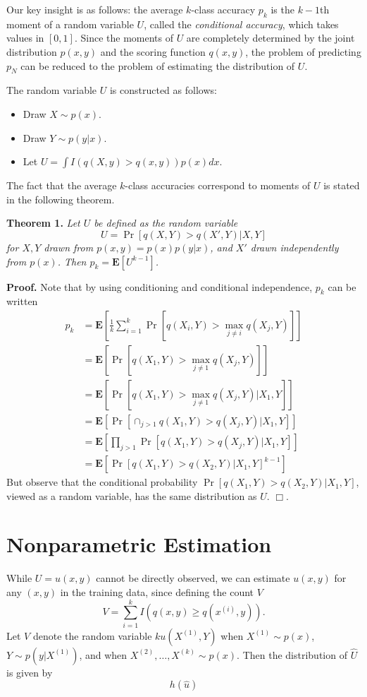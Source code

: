 \documentclass{article}
\newcommand{\E}{\textbf{E}}
\begin{document}
Our key insight is as follows: the average $k$-class accuracy $p_k$ is
the $k-1$th moment of a random variable $U$, called the
\emph{conditional accuracy}, which takes values in $[0,1]$.  Since the
moments of $U$ are completely determined by the joint distribution
$p(x, y)$ and the scoring function $q(x, y)$, the problem of
predicting $p_N$ can be reduced to the problem of estimating the
distribution of $U$.

The random variable $U$ is constructed as follows:
\begin{itemize}
\item Draw $X \sim p(x)$.
\item Draw $Y \sim p(y|x)$.
\item Let $U = \int I(q(X, y) > q(x, y)) p(x) dx.$
\end{itemize}

The fact that the average $k$-class accuracies correspond to moments of
$U$ is stated in the following theorem.

\noindent\textbf{Theorem 1.} \emph{
Let $U$ be defined as the random variable
\[U = \Pr[q(X, Y) > q(X', Y)|X, Y]\]
for $X, Y$ drawn from $p(x, y) = p(x) p(y|x)$,
and $X'$ drawn independently from $p(x)$.
Then $p_k = \E[U^{k-1}]$.
}

\noindent\textbf{Proof.}  Note that by using conditioning and
conditional independence, $p_k$ can be written
\begin{align*}
p_k &= \E\left[ \frac{1}{k}\sum_{i=1}^k  \Pr[q(X_i, Y) > \max_{j\neq i} q(X_j, Y)] \right]
\\&= \E\left[ \Pr[q(X_1, Y) > \max_{j\neq 1} q(X_j, Y)] \right]
\\&= \E[\Pr[q(X_1, Y) > \max_{j\neq 1} q(X_j, Y)|X_1, Y]]
\\&= \E[\Pr[\cap_{j > 1} q(X_1, Y) > q(X_j, Y)|X_1, Y]]
\\&= \E[\prod_{j > 1}\Pr[q(X_1, Y) > q(X_j, Y)|X_1, Y]]
\\&= \E[\Pr[q(X_1, Y) > q(X_2, Y)|X_1, Y]^{k-1}]
\end{align*}
But observe that the conditional probability $\Pr[q(X_1, Y) >
  q(X_2, Y)|X_1, Y]$, viewed as a random variable, has the same
distribution as $U$. $\Box$.



\section{Nonparametric Estimation}

While $U = u(x, y)$ cannot be directly observed, we can estimate $u(x, y)$ for any $(x, y)$ in the training data,
since defining the count $V$
\[
V = \sum_{i=1}^k I(q(x, y) \geq q(x^{(i)}, y)).
\]
Let $V$ denote the random variable $k u(X^{(1)}, Y)$ when $X^{(1)} \sim p(x)$,
$Y \sim p(y|X^{(1)})$, and when $X^{(2)},\hdots, X^{(k)} \sim p(x)$.
Then the distribution of $\hat{U}$ is given by
\[
h(\hat{u})
\]
\end{document}
